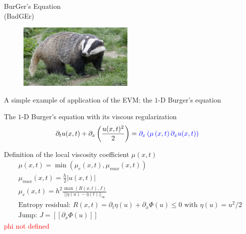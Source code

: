 \documentclass[xcolor=dvipsnames,10pt]{beamer}
\newcommand{\tcr}[1]{\textcolor{red}{#1}}
\begin{document}
\begin{frame}
\begin{center}
BurGer's Equation \\
(BadGEr)
\end{center}
\begin{figure}[H]
\centering
\includegraphics[width=0.5\textwidth]{../figures/badger.png}
\end{figure}
\end{frame}
\begin{frame}{A simple example of application of the EVM: the $1$-D Burger's equation}
\begin{block}{The $1$-D Burger's equation with its viscous regularization}
\begin{equation}
\partial_t u(x,t) + \partial_x \left( \frac{u(x,t)^2}{2} \right) = \textcolor{blue}{\partial_x \left( \mu \left(x,t \right) \partial_x u(x,t) \right)} \nonumber
\end{equation}
\end{block}
\begin{block}{Definition of the local viscosity coefficient $\mu(x,t)$}
\begin{align}
&\mu(x,t) = \min \left( \mu_e(x,t), \mu_{max}(x,t) \right) \nonumber \\
&\mu_{max} (x,t) = \frac{h}{2} | u(x,t) | \nonumber \\
&\mu_e(x,t) = h^2 \frac{\max \left( R(x,t), J \right)}{|| \eta(u) - \bar{\eta}(t) ||_\infty} \nonumber \\
& \text{Entropy residual: }R(x,t) = \partial_t \eta(u) + \partial_x \Phi(u) \leq 0 \text{ with } \eta(u) = u^2 / 2 \nonumber \\
&\text{Jump: } J = [[ \partial_x \Phi(u) ]] \nonumber
\end{align}
\tcr{phi not defined}
\end{block}
\end{frame}
\end{document}
